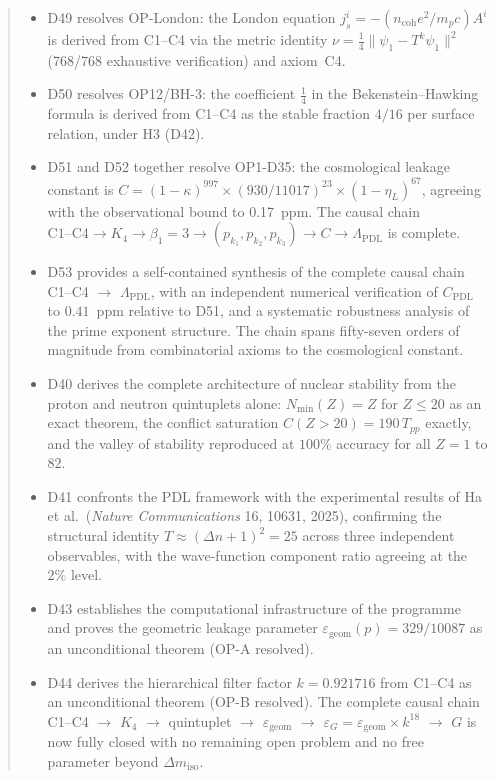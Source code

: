 \documentclass[11pt,a4paper]{article}
\theoremstyle{plain}
\theoremstyle{definition}
\theoremstyle{remark}
\newcommand{\Kfour}{K_4}
\newcommand{\Tpp}{T_{pp}}
\newcommand{\Nmin}{N_{\min}}
\begin{document}
\begin{abstract}
\begin{itemize}
\item D49 resolves OP-London: the London equation $j^i_s = -(n_{\mathrm{coh}} e^2/m_p c) A^i$ is derived from C1--C4 via the metric identity $\nu = \tfrac{1}{4}\|\psi_1 - T^k\psi_1\|^2$ (768/768 exhaustive verification) and axiom~C4.
\item D50 resolves OP12/BH-3: the coefficient $\tfrac{1}{4}$ in the Bekenstein--Hawking formula is derived from C1--C4 as the stable fraction $4/16$ per surface relation, under H3 (D42).
\item D51 and D52 together resolve OP1-D35: the cosmological leakage constant is $C = (1-\kappa)^{997} \times (930/11017)^{23} \times (1-\eta_L)^{67}$, agreeing with the observational bound to 0.17~ppm. The causal chain $\mathrm{C1}\text{--}\mathrm{C4} \to \Kfour \to \beta_1=3 \to (p_{k_1},p_{k_2},p_{k_3}) \to C \to \Lambda_{\mathrm{PDL}}$ is complete.
\item D53 provides a self-contained synthesis of the complete causal chain C1--C4 $\to$ $\Lambda_{\mathrm{PDL}}$, with an independent numerical verification of $C_{\mathrm{PDL}}$ to $0.41$~ppm relative to D51, and a systematic robustness analysis of the prime exponent structure. The chain spans fifty-seven orders of magnitude from combinatorial axioms to the cosmological constant.
\item D40 derives the complete architecture of nuclear stability from the proton and neutron quintuplets alone: $\Nmin(Z) = Z$ for $Z \leq 20$ as an exact theorem, the conflict saturation $C(Z>20) = 190\,\Tpp$ exactly, and the valley of stability reproduced at $100\%$ accuracy for all $Z=1$ to $82$.
\item D41 confronts the PDL framework with the experimental results of Ha et al.\ (\textit{Nature Communications} 16, 10631, 2025), confirming the structural identity $T \approx (\Delta n+1)^2 = 25$ across three independent observables, with the wave-function component ratio agreeing at the $2\%$ level.
\item D43 establishes the computational infrastructure of the programme and proves the geometric leakage parameter $\varepsilon_{\mathrm{geom}}(p) = 329/10087$ as an unconditional theorem (OP-A resolved).
\item D44 derives the hierarchical filter factor $k = 0.921716$ from C1--C4 as an unconditional theorem (OP-B resolved). The complete causal chain C1--C4 $\to$ $K_4$ $\to$ quintuplet $\to$ $\varepsilon_{\mathrm{geom}}$ $\to$ $\varepsilon_G = \varepsilon_{\mathrm{geom}} \times k^{18}$ $\to$ $G$ is now fully closed with no remaining open problem and no free parameter beyond $\Delta m_{\mathrm{iso}}$.

\end{itemize}
\end{abstract}
\end{document}

